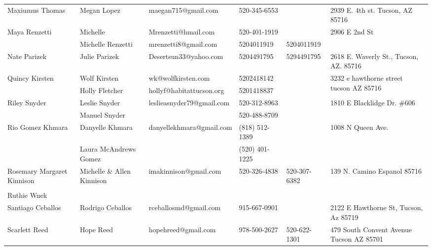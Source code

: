 \documentclass[landscape]{article}\usepackage[]{graphicx}\usepackage[]{color}
\begin{document}
\begin{longtable}{|p{100pt}|p{100pt}|p{140pt}|p{60pt}|p{64pt}|p{120pt}|}
 &  &  &  &  & \\
\hline
\multirow{2}{100pt}{Maxiumus Thomas} & Megan Lopez  & maegan715@gmail.com  & 520-345-6553 &  & \multirow{2}{120pt}{2939 E. 4th st. Tucson, AZ 85716} \\
 &  &  &  &  & \\
\hline
\multirow{2}{100pt}{Maya Renzetti} & Michelle  & Mrenzetti@hmail.com & 520-401-1919 &  & \multirow{2}{120pt}{2906 E 2nd St} \\
 & Michelle Renzetti & mrenzetti8@gmail.com & 5204011919 & 5204011919 & \\
\hline
\multirow{2}{100pt}{Nate Parizek} & Julie Parizek & Desertsun33@yahoo.com & 5204491795 & 5294491795 & \multirow{2}{120pt}{2618 E. Waverly St., Tucson, AZ. 85716} \\
 &  &  &  &  & \\
\hline
\multirow{2}{100pt}{Quincy Kirsten} & Wolf Kirsten & wk@wolfkirsten.com & 5202418142 &  & \multirow{2}{120pt}{3232 e hawthorne street tucson AZ 85716} \\
 & Holly Fletcher  & hollyf@habitattucson.org & 5201418837 &  & \\
\hline
\multirow{2}{100pt}{Riley Snyder} & Leslie Snyder & leslieasnyder79@gmail.com & 520-312-8963 &  & \multirow{2}{120pt}{1810 E Blacklidge Dr. \#606} \\
 & Manuel Snyder &  & 520-488-8709 &  & \\
\hline
\multirow{2}{100pt}{Rio Gomez Khmara} & Danyelle Khmara & danyellekhmara@gmail.com & (818) 512-1389 &  & \multirow{2}{120pt}{1008 N Queen Ave.} \\
 & Laura McAndrews Gomez &  & (520) 401-1225 &  & \\
\hline
\multirow{2}{100pt}{Rosemary Margaret Kinnison} & Michelle \& Allen Kinnison & imakinnison@gmail.com & 520-326-4838 & 520-307-6382 & \multirow{2}{120pt}{139 N. Camino Espanol 85716} \\
 &  &  &  &  & \\
\hline
\multirow{2}{100pt}{Ruthie Wnek} &  &  &  &  & \multirow{2}{120pt}{} \\
 &  &  &  &  & \\
\hline
\multirow{2}{100pt}{Santiago Ceballos} & Rodrigo Ceballos & rceballosmd@gmail.com & 915-667-0901 &  & \multirow{2}{120pt}{2122 E Hawthorne St, Tucson, Az 85719} \\
 &  &  &  &  & \\
\hline
\multirow{2}{100pt}{Scarlett Reed} & Hope Reed & hopehreed@gmail.com & 978-500-2627 & 520-622-1301 & \multirow{2}{120pt}{479 South Convent Avenue Tucson AZ  85701} \\

\end{longtable}
\end{document}
